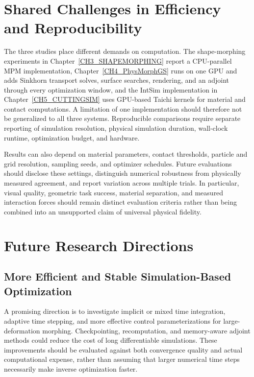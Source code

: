 \section{Shared Challenges in Efficiency and Reproducibility}
\label{subsec:lim-scope}

The three studies place different demands on computation. The shape-morphing experiments in Chapter~\ref{CH3_SHAPEMORPHING} report a CPU-parallel MPM implementation, Chapter~\ref{CH4_PhysMorphGS} runs on one GPU and adds Sinkhorn transport solves, surface searches, rendering, and an adjoint through every optimization window, and the IntSim implementation in Chapter~\ref{CH5_CUTTINGSIM} uses GPU-based Taichi kernels for material and contact computations. A limitation of one implementation should therefore not be generalized to all three systems. Reproducible comparisons require separate reporting of simulation resolution, physical simulation duration, wall-clock runtime, optimization budget, and hardware.

Results can also depend on material parameters, contact thresholds, particle and grid resolution, sampling seeds, and optimizer schedules. Future evaluations should disclose these settings, distinguish numerical robustness from physically measured agreement, and report variation across multiple trials. In particular, visual quality, geometric task success, material separation, and measured interaction forces should remain distinct evaluation criteria rather than being combined into an unsupported claim of universal physical fidelity.

\section{Future Research Directions}
\label{subsec:future}

\subsection{More Efficient and Stable Simulation-Based Optimization}
A promising direction is to investigate implicit or mixed time integration, adaptive time stepping, and more effective control parameterizations for large-deformation morphing. Checkpointing, recomputation, and memory-aware adjoint methods could reduce the cost of long differentiable simulations. These improvements should be evaluated against both convergence quality and actual computational expense, rather than assuming that larger numerical time steps necessarily make inverse optimization faster.

